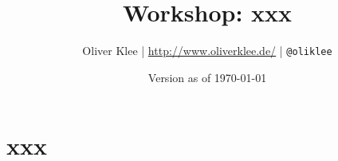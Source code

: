 \documentclass[a4paper,openany,twoside,titlepage,10pt]{scrbook}
\author{Oliver Klee | \url{http://www.oliverklee.de/} | \texttt{@oliklee}}
\title{Workshop: xxx}
\date{Version as of \today}
\begin{document}
\frontmatter

\maketitle

\tableofcontents

\mainmatter

\chapter{xxx}






\backmatter
\end{document}
